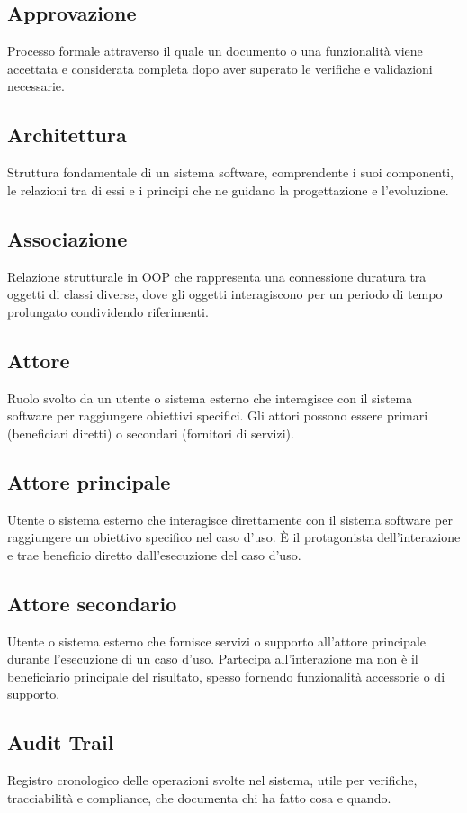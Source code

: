 \documentclass[a4paper,11pt]{article}
\begin{document}
\subsection{Approvazione}
Processo formale attraverso il quale un documento o una funzionalità viene accettata e considerata completa dopo aver superato le verifiche e validazioni necessarie.

\subsection{Architettura}
Struttura fondamentale di un sistema software, comprendente i suoi componenti, le relazioni tra di essi e i principi che ne guidano la progettazione e l'evoluzione.

\subsection{Associazione}
Relazione strutturale in OOP che rappresenta una connessione duratura tra oggetti di classi diverse, dove gli oggetti interagiscono per un periodo di tempo prolungato condividendo riferimenti.

\subsection{Attore}
Ruolo svolto da un utente o sistema esterno che interagisce con il sistema software per raggiungere obiettivi specifici. Gli attori possono essere primari (beneficiari diretti) o secondari (fornitori di servizi).

\subsection{Attore principale}
Utente o sistema esterno che interagisce direttamente con il sistema software per raggiungere un obiettivo specifico nel caso d'uso. È il protagonista dell'interazione e trae beneficio diretto dall'esecuzione del caso d'uso.

\subsection{Attore secondario}
Utente o sistema esterno che fornisce servizi o supporto all'attore principale durante l'esecuzione di un caso d'uso. Partecipa all'interazione ma non è il beneficiario principale del risultato, spesso fornendo funzionalità accessorie o di supporto.

\subsection{Audit Trail}
Registro cronologico delle operazioni svolte nel sistema, utile per verifiche, tracciabilità e compliance, che documenta chi ha fatto cosa e quando.
\end{document}
